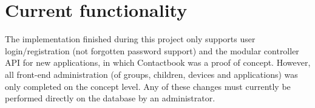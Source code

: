 \section{Current functionality}

The implementation finished during this project only supports user login/registration (not forgotten password support) and the modular controller API for new applications, in which Contactbook was a proof of concept. However, all front-end administration (of groups, children, devices and applications) was only completed on the concept level. Any of these changes must currently be performed directly on the database by an administrator.

